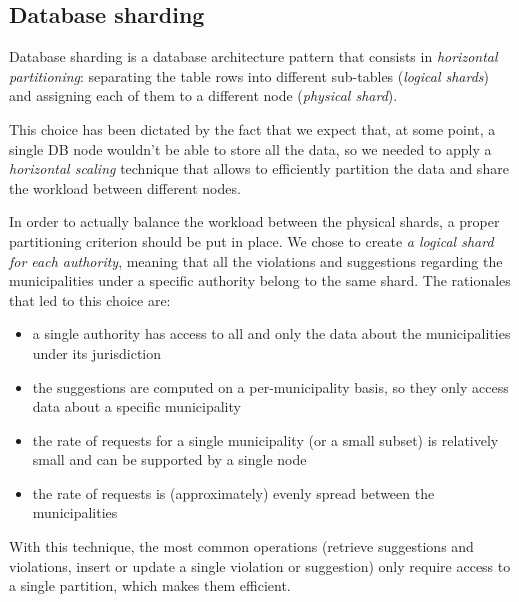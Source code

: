 \subsection{Database sharding}
\label{subsec:db_sharding}
Database sharding is a database architecture pattern that consists in
\emph{horizontal partitioning}: separating the table rows into different
sub-tables (\emph{logical shards}) and assigning each of them to
a different node (\emph{physical shard}).

This choice has been dictated by the fact that we expect that, at some point,
a single DB node wouldn't be able to store all the data, so we needed to apply
a \emph{horizontal scaling} technique that allows to efficiently partition the
data and share the workload between different nodes.

In order to actually balance the workload between the physical shards, a proper
partitioning criterion should be put in place.
We chose to create \emph{a logical shard for each authority}, meaning that
all the violations and suggestions regarding the municipalities under a specific
authority belong to the same shard. The rationales that led to this choice are:
\begin{itemize}
    \item a single authority has access to all and only the data about the
    municipalities under its jurisdiction
    \item the suggestions are computed on a per-municipality basis, so they
    only access data about a specific municipality
    \item the rate of requests for a single municipality (or a small subset)
    is relatively small and can be supported by a single node
    \item the rate of requests is (approximately) evenly spread between
    the municipalities
\end{itemize}
With this technique, the most common operations (retrieve suggestions and
violations, insert or update a single violation or suggestion) only require
access to a single partition, which makes them efficient.